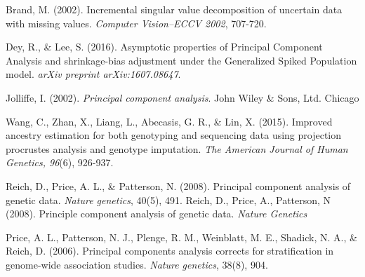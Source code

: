 \documentclass{article}
\begin{document}
\begin{thebibliography}{}
 
 Brand, M. (2002). Incremental singular value decomposition of uncertain data with missing values. {\it Computer Vision--ECCV 2002}, 707-720.

 Dey, R., \& Lee, S. (2016). Asymptotic properties of Principal Component Analysis and shrinkage-bias adjustment under the Generalized Spiked Population model. {\it arXiv preprint arXiv:1607.08647}.
  
 Jolliffe, I. (2002). {\it Principal component analysis}. John Wiley \& Sons, Ltd.
Chicago	


  Wang, C., Zhan, X., Liang, L., Abecasis, G. R., \& Lin, X. (2015). Improved ancestry estimation for both genotyping and sequencing data using projection procrustes analysis and genotype imputation. {\it The American Journal of Human Genetics, 96}(6), 926-937.

  Reich, D., Price, A. L., \& Patterson, N.
   (2008). Principal component analysis of genetic data. {\it Nature genetics}, 40(5), 491.
   Reich, D., Price, A., Patterson, N (2008).
   Principle component analysis of genetic data. {\it Nature Genetics}

    Price, A. L., Patterson, N. J., Plenge,
     R. M., Weinblatt, M. E., Shadick, N. A., \& Reich, D. (2006). Principal
     components analysis corrects for stratification in genome-wide association
     studies. {\it Nature genetics}, 38(8), 904.

\end{thebibliography}
\end{document}
